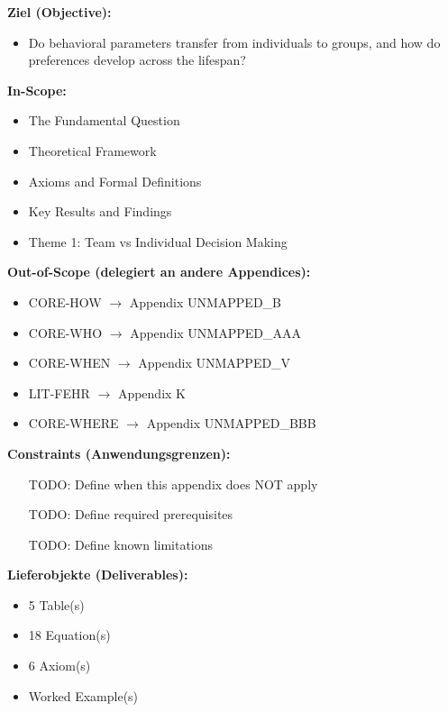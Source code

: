 \begin{tcolorbox}[
    colback=orange!5!white,
    colframe=orange!75!black,
    title={\textbf{Appendix Scope: Ziel / In-Scope / Out-of-Scope / Constraints}},
    fonttitle=\bfseries
]

\textbf{Ziel (Objective):}
\begin{itemize}[nosep]
    \item Do behavioral parameters transfer from individuals to groups, and how do preferences develop across the lifespan?
\end{itemize}

\textbf{In-Scope:}
\begin{itemize}[nosep]
    \item The Fundamental Question
    \item Theoretical Framework
    \item Axioms and Formal Definitions
    \item Key Results and Findings
    \item Theme 1: Team vs Individual Decision Making
\end{itemize}

\textbf{Out-of-Scope (delegiert an andere Appendices):}
\begin{itemize}[nosep]
    \item CORE-HOW $\rightarrow$ Appendix UNMAPPED_B
    \item CORE-WHO $\rightarrow$ Appendix UNMAPPED_AAA
    \item CORE-WHEN $\rightarrow$ Appendix UNMAPPED_V
    \item LIT-FEHR $\rightarrow$ Appendix K
    \item CORE-WHERE $\rightarrow$ Appendix UNMAPPED_BBB
\end{itemize}

\textbf{Constraints (Anwendungsgrenzen):}
\begin{itemize}[nosep]
    \item [TODO: Define when this appendix does NOT apply]
    \item [TODO: Define required prerequisites]
    \item [TODO: Define known limitations]
\end{itemize}

\textbf{Lieferobjekte (Deliverables):}
\begin{itemize}[nosep]
    \item 5 Table(s)
    \item 18 Equation(s)
    \item 6 Axiom(s)
    \item Worked Example(s)
\end{itemize}

\end{tcolorbox}




